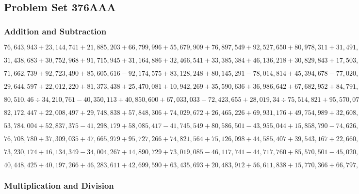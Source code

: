 \hypertarget{problem-set-376aaa}{%
\subsection{Problem Set 376AAA}\label{problem-set-376aaa}}

\hypertarget{addition-and-subtraction}{%
\subsubsection{Addition and
Subtraction}\label{addition-and-subtraction}}

\(76,643,943+23,144,741+21,885,203+66,799,996+55,679,909+76,897,549+92,527,650+80,978,311+31,491,437+91,491,729\)

\(31,438,683+30,752,968+91,715,945+31,164,886+32,466,541+33,385,384+46,136,218+30,829,843+17,503,655+79,206,717\)

\(71,662,739+92,723,490+85,605,616-92,174,575+83,128,248+80,145,291-78,014,814+45,394,678-77,020,375-98,062,804\)

\(29,644,597+22,012,220+81,373,438+25,470,081+10,942,269+35,590,636+36,986,642+67,682,952+84,791,938+39,133,148\)

\(80,510,46÷34,210,761-40,350,113+40,850,600+67,033,033+72,423,655+28,019,34÷75,514,821+95,570,071-26,159,066\)

\(82,172,447+22,008,497+29,748,838+57,848,306+74,029,672+26,465,226+69,931,176+49,754,989+32,608,365+30,593,990\)

\(53,784,004+52,837,375-41,298,179+58,085,417-41,745,549+80,586,501-43,955,044+15,858,790-74,626,800+63,946,825\)

\(76,708,780+37,309,035+47,665,979+95,727,266+74,821,564+75,126,098+44,585,407+39,543,167+22,660,031+35,144,006\)

\(73,230,174+16,134,349-34,004,267+14,890,729+73,019,085-46,117,741-44,717,760+85,570,501-45,020,883+72,173,746\)

\(40,448,425+40,197,266+46,283,611+42,699,590+63,435,693+20,483,912+56,611,838+15,770,366+66,797,787+70,596,546\)

\hypertarget{multiplication-and-division}{%
\subsubsection{Multiplication and
Division}\label{multiplication-and-division}}

